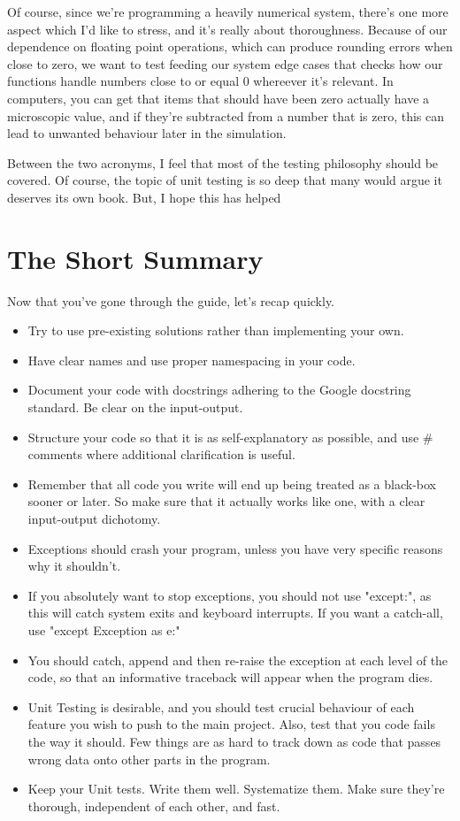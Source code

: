 \documentclass[10pt,a4paper]{article}
\begin{document}
Of course, since we're programming a heavily numerical system, there's one more aspect which I'd like to stress, and it's really about thoroughness. Because of our dependence on floating point operations, which can produce rounding errors when close to zero, we want to test feeding our system edge cases that checks how our functions handle numbers close to or equal 0 whereever it's relevant. In computers, you can get that items that should have been zero actually have a microscopic value, and if they're subtracted from a number that is zero, this can lead to unwanted behaviour later in the simulation. 

Between the two acronyms, I feel that most of the testing philosophy should be covered. Of course, the topic of unit testing is so deep that many would argue it deserves its own book. But, I hope this has helped

\newpage
\section{The Short Summary}
Now that you've gone through the guide, let's recap quickly.

\begin{itemize}
\item Try to use pre-existing solutions rather than implementing your own.
\item Have clear names and use proper namespacing in your code. 
\item Document your code with docstrings adhering to the Google docstring standard. Be clear on the input-output.
\item Structure your code so that it is as self-explanatory as possible, and use \# comments where additional clarification is useful.
\item Remember that all code you write will end up being treated as a black-box sooner or later. So make sure that it actually works like one, with a clear input-output dichotomy. 
\item Exceptions should crash your program, unless you have very specific reasons why it shouldn't.
\item If you absolutely want to stop exceptions, you should not use "except:", as this will catch system exits and keyboard interrupts. If you want a catch-all, use "except Exception as e:"
\item You should catch, append and then re-raise the exception at each level of the code, so that an informative traceback will appear when the program dies.
\item Unit Testing is desirable, and you should test crucial behaviour of each feature you wish to push to the main project. Also, test that you code fails the way it should. Few things are as hard to track down as code that passes wrong data onto other parts in the program.
\item Keep your Unit tests. Write them well. Systematize them. Make sure they're thorough, independent of each other, and fast.
\end{itemize}
\end{document}
